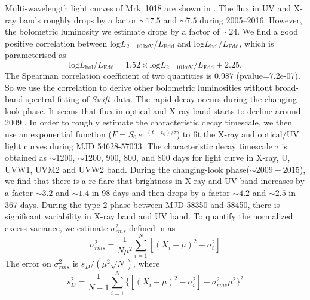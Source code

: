 \documentclass[twocolumn]{aastex63}
\newcommand{\swift}{{\small \it Swift}}
\begin{document}
 
Multi-wavelength light curves of Mrk~1018 are shown in . The flux in UV and X-ray bands roughly drops by a factor $\sim17.5$ and $\sim7.5$ during 2005--2016. However, the bolometric luminosity we estimate drops by a factor of $\sim24$. We find a good positive correlation between log$L_\mathrm{2-10\,keV}/L_\mathrm{Edd}$ and log$L_\mathrm{bol}/L_\mathrm{Edd}$, which is parameterised as 
\begin{equation}\label{Lbol-LX}
\mathrm{log} L_\mathrm{bol}/L_\mathrm{Edd}= 1.52 \times \mathrm{log} L_\mathrm{2-10\,keV}/L_\mathrm{Edd}+2.25.
\end{equation} The Spearman correlation coefficient of two quantities is 0.987 (pvalue=7.2e-07). So we use the correlation to derive other bolometric luminosities without broad-band spectral fitting of \swift\, data. The rapid decay occurs during the changing-look phase. It seems that flux in optical and X-ray band starts to decline around 2009 \citep[see also the optical light curve in ][]{2016A&A...593L...8M}. In order to roughly estimate the characteristic decay timescale, we then use an exponential function ($F=S_0\,e^{-(t-t_0)/\tau }$) to fit the X-ray and optical/UV light curves during MJD 54628-57033. The characteristic decay timescale $\tau$ is obtained as $\sim$1200, $\sim$1200, 900, 800, and 800 days for light curve in X-ray, U, UVW1, UVM2 and UVW2 band. During the changing-look phase($\sim 2009-2015$), we find that there is a re-flare that brightness in X-ray and UV band increases by a factor $\sim3.2$ and $\sim1.4$ in 98 days and then drops by a factor $\sim4.2$ and $\sim2.5$ in 367 days. During the type 2 phase between MJD 58350 and 58450, there is significant variability in X-ray band and UV band. To quantify the normalized excess variance, we estimate $\sigma^2_{rms} $ defined in \citet{1999ApJ...524..667T} as
\begin{equation}
\sigma^2_{rms}=\frac{1}{N\mu^2}\sum_{i=1}^{N}[(X_i-\mu)^2-\sigma_i^2]
\end{equation}
The error on $\sigma^2_{rms}$ is $s_D/(\mu^2\sqrt{N})$, where \begin{equation}
s_D^2=\frac{1}{N-1}\sum_{i=1}^{N}\{[(X_i-\mu)^2-\sigma_i^2]-\sigma^2_{rms}\mu^2\}^2
\end{equation}

\end{document}
